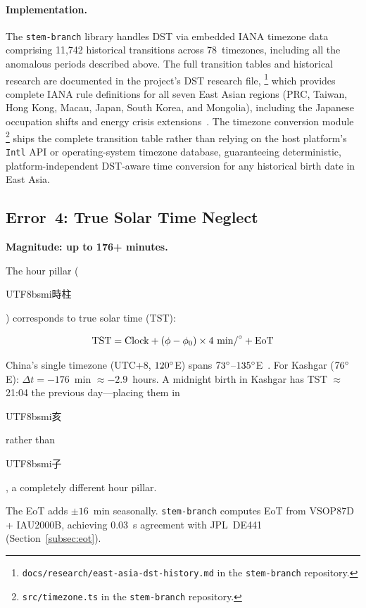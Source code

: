\documentclass[10pt,a4paper]{article}
\newcommand{\zh}[1]{\begin{CJK}{UTF8}{bsmi}#1\end{CJK}}
\begin{document}
\paragraph{Implementation.}
The \texttt{stem-branch} library handles DST via embedded IANA timezone
data comprising 11,742 historical transitions across 78~timezones,
including all the anomalous periods described above.  The full transition
tables and historical research are documented in the project's
DST research file,%
\footnote{\texttt{docs/research/east-asia-dst-history.md} in the
\texttt{stem-branch} repository.}
which provides complete IANA rule definitions for all seven East Asian
regions (PRC, Taiwan, Hong Kong, Macau, Japan, South Korea, and
Mongolia), including the Japanese occupation shifts and energy crisis
extensions~\cite{iana_tzdata_asia, hko_summertime, wetoasthk_dst,
korea_tz_history, japan_dst_abolition}.  The timezone conversion module%
\footnote{\texttt{src/timezone.ts} in the \texttt{stem-branch}
repository.}
ships the complete transition table rather than relying on the host
platform's \texttt{Intl} API or operating-system timezone database,
guaranteeing deterministic, platform-independent DST-aware time
conversion for any historical birth date in East Asia.

\subsection{Error~4: True Solar Time Neglect}
\label{subsec:error4}

\textbf{Magnitude: up to 176+ minutes.}

The hour pillar (\zh{時柱}) corresponds to true solar time (TST):

\begin{equation}
  \text{TST} = \text{Clock} + (\phi - \phi_0) \times 4~\text{min/}\degree
  + \text{EoT}
  \label{eq:tst}
\end{equation}

China's single timezone (UTC+8, $120\degree$E) spans $73\degree$--$135\degree$E~\cite{china_timezone}.
For Kashgar ($76\degree$E): $\Delta t = -176$~min $\approx -2.9$~hours. A
midnight birth in Kashgar has TST $\approx$ 21:04 the previous day---placing
them in \zh{亥} rather than \zh{子}, a completely different hour pillar.

The EoT adds $\pm 16$~min seasonally. \texttt{stem-branch} computes EoT from
VSOP87D + IAU2000B, achieving 0.03~s agreement with JPL~DE441
(Section~\ref{subsec:eot}).
\end{document}
